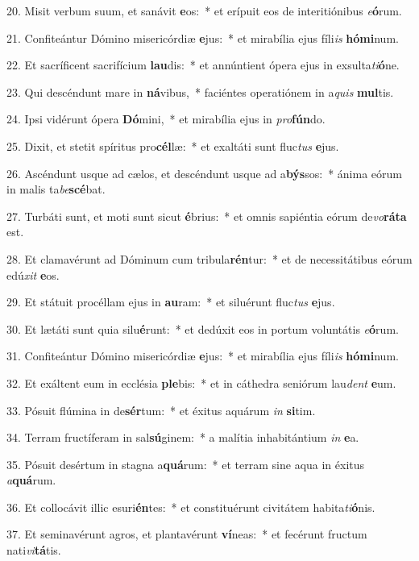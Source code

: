 20. Misit verbum suum, et sanávit \textbf{e}os:~*  et erípuit eos de interitiónibus \textit{e}\textbf{ó}rum.\

21. Confiteántur Dómino misericórdiæ \textbf{e}jus:~*  et mirabília ejus fíli\textit{is} \textbf{hó}\textbf{mi}num.\

22. Et sacríficent sacrifícium \textbf{lau}dis:~*  et annúntient ópera ejus in exsulta\textit{ti}\textbf{ó}ne.\

23. Qui descéndunt mare in \textbf{ná}vibus,~*  faciéntes operatiónem in a\textit{quis} \textbf{mul}tis.\

24. Ipsi vidérunt ópera \textbf{Dó}mini,~*  et mirabília ejus in \textit{pro}\textbf{fún}do.\

25. Dixit, et stetit spíritus pro\textbf{cél}læ:~*  et exaltáti sunt fluc\textit{tus} \textbf{e}jus.\

26. Ascéndunt usque ad cælos, et descéndunt usque ad a\textbf{býs}sos:~*  ánima eórum in malis ta\textit{be}\textbf{scé}bat.\

27. Turbáti sunt, et moti sunt sicut \textbf{é}brius:~*  et omnis sapiéntia eórum de\textit{vo}\textbf{rá}\textbf{ta} est.\

28. Et clamavérunt ad Dóminum cum tribula\textbf{rén}tur:~*  et de necessitátibus eórum edú\textit{xit} \textbf{e}os.\

29. Et státuit procéllam ejus in \textbf{au}ram:~*  et siluérunt fluc\textit{tus} \textbf{e}jus.\

30. Et lætáti sunt quia silu\textbf{é}runt:~*  et dedúxit eos in portum voluntátis \textit{e}\textbf{ó}rum.\

31. Confiteántur Dómino misericórdiæ \textbf{e}jus:~*  et mirabília ejus fíli\textit{is} \textbf{hó}\textbf{mi}num.\

32. Et exáltent eum in ecclésia \textbf{ple}bis:~*  et in cáthedra seniórum lau\textit{dent} \textbf{e}um.\

33. Pósuit flúmina in de\textbf{sér}tum:~*  et éxitus aquárum \textit{in} \textbf{si}tim.\

34. Terram fructíferam in sal\textbf{sú}ginem:~*  a malítia inhabitántium \textit{in} \textbf{e}a.\

35. Pósuit desértum in stagna a\textbf{quá}rum:~*  et terram sine aqua in éxitus \textit{a}\textbf{quá}rum.\

36. Et collocávit illic esuri\textbf{én}tes:~*  et constituérunt civitátem habita\textit{ti}\textbf{ó}nis.\

37. Et seminavérunt agros, et plantavérunt \textbf{ví}neas:~*  et fecérunt fructum nati\textit{vi}\textbf{tá}tis.\

